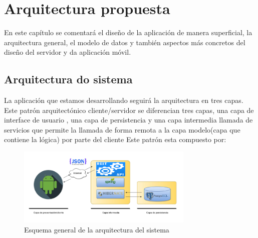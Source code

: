 \newpage
\section{Arquitectura propuesta}
\label{s:dev:arch}
 

En este capítulo se comentará el diseño de la aplicación de manera superficial, la arquitectura general, el
modelo de datos y también aspectos más concretos del diseño del servidor y da aplicación
móvil.



\subsection{Arquitectura do sistema}
La aplicación que estamos desarrollando seguirá la arquitectura
en tres capas. Este patrón arquitectónico cliente/servidor se diferencian tres
capas, una capa de interface de usuario , una capa de persistencia
y una capa intermedia llamada de servicios que permite la llamada de forma remota a la capa modelo(capa que contiene la lógica) por parte del cliente Este patrón esta compuesto por:




\begin{figure}[H]
		\centering
		\includegraphics[width=0.75\textwidth] {arquitectura.png}
		\caption{Esquema general de la arquitectura del sistema }
	\end{figure}


